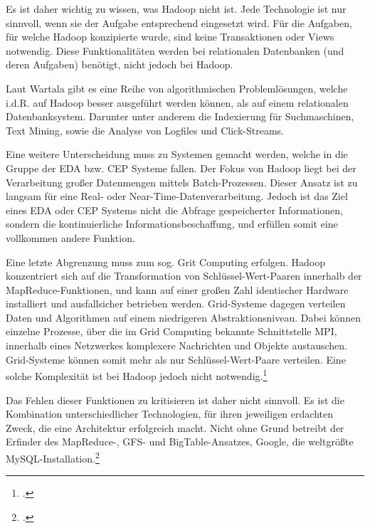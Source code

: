 Es ist daher wichtig zu wissen, was Hadoop nicht ist. Jede Technologie ist nur sinnvoll, wenn sie der Aufgabe entsprechend eingesetzt wird. Für die Aufgaben, für welche Hadoop konzipierte wurde, sind keine Transaktionen oder Views notwendig. Diese Funktionalitäten werden bei relationalen Datenbanken (und deren Aufgaben) benötigt, nicht jedoch bei Hadoop.

Laut Wartala gibt es eine Reihe von algorithmischen Problemlösungen, welche i.d.R. auf Hadoop besser ausgeführt werden können, als auf einem relationalen Datenbanksystem. Darunter unter anderem die Indexierung für Suchmaschinen, Text Mining, sowie die Analyse von Logfiles und Click-Streams.

Eine weitere Unterscheidung muss zu Systemen gemacht werden, welche in die Gruppe der \ac{EDA} bzw. \ac{CEP} Systeme fallen. Der Fokus von Hadoop liegt bei der Verarbeitung großer Datenmengen mittels Batch-Prozessen. Dieser Ansatz ist zu langsam für eine Real- oder Near-Time-Datenverarbeitung. Jedoch ist das Ziel eines \ac{EDA} oder \ac{CEP} Systems nicht die Abfrage gespeicherter Informationen, sondern die kontinuierliche Informationsbeschaffung, und erfüllen somit eine vollkommen andere Funktion.

Eine letzte Abgrenzung muss zum sog. Grit Computing erfolgen. Hadoop konzentriert sich auf die Transformation von Schlüssel-Wert-Paaren innerhalb der MapReduce-Funktionen, und kann auf einer großen Zahl identischer Hardware installiert und ausfallsicher betrieben werden. Grid-Systeme dagegen verteilen Daten und Algorithmen auf einem niedrigeren Abstraktionsniveau. Dabei können einzelne Prozesse, über die im Grid Computing bekannte Schnittstelle \ac{MPI}, innerhalb eines Netzwerkes komplexere Nachrichten und Objekte austauschen. Grid-Systeme können somit mehr als nur Schlüssel-Wert-Paare verteilen. Eine solche Komplexität ist bei Hadoop jedoch nicht notwendig.\footcite[Vgl.][S. 30-33]{Wartala.2012}

Das Fehlen dieser Funktionen zu kritisieren ist daher nicht sinnvoll. Es ist die Kombination unterschiedlicher Technologien, für ihren jeweiligen erdachten Zweck, die eine Architektur erfolgreich macht. \flqq Nicht ohne Grund betreibt der Erfinder des MapReduce-, \ac{GFS}- und BigTable-Ansatzes, Google, die weltgrößte MySQL-Installation.\frqq\footcite[S. 31]{Wartala.2012}

